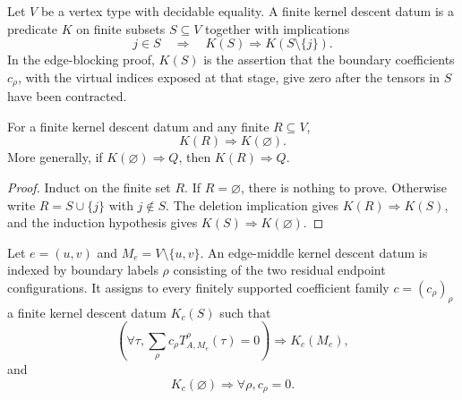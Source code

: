 \begin{definition}%
    \label{def:peps_finiteRegionKernelDescent}
    \leanok
    Let $V$ be a vertex type with decidable equality. A finite kernel descent
    datum is a predicate $K$ on finite subsets $S\subseteq V$ together with
    implications
    \[
        j\in S \quad\Longrightarrow\quad K(S)\Longrightarrow K(S\setminus\{j\}).
    \]
    In the edge-blocking proof, $K(S)$ is the assertion that the boundary
    coefficients $c_{\rho}$, with the virtual indices exposed at that stage,
    give zero after the tensors in $S$ have been contracted.
\end{definition}

\begin{lemma}%
    \label{lem:peps_finiteRegionKernelDescent}
    \leanok
    For a finite kernel descent datum and any finite $R\subseteq V$,
    \[
        K(R)\Longrightarrow K(\varnothing).
    \]
    More generally, if $K(\varnothing)\Longrightarrow Q$, then
    $K(R)\Longrightarrow Q$.
\end{lemma}
\begin{proof}\leanok
    Induct on the finite set $R$. If $R=\varnothing$, there is nothing to
    prove. Otherwise write $R=S\cup\{j\}$ with $j\notin S$. The deletion
    implication gives $K(R)\Longrightarrow K(S)$, and the induction hypothesis
    gives $K(S)\Longrightarrow K(\varnothing)$.
\end{proof}

\begin{definition}%
    \label{def:peps_edgeMiddleKernelDescentData}
    \leanok
    Let $e=(u,v)$ and $M_e=V\setminus\{u,v\}$. An edge-middle kernel descent
    datum is indexed by boundary labels $\rho$ consisting of the two residual
    endpoint configurations. It assigns to every finitely supported coefficient
    family $c=(c_{\rho})_{\rho}$ a finite kernel descent datum $K_c(S)$ such that
    \[
        \left(\forall\tau,
        \sum_{\rho}c_{\rho}
        T_{A,M_e}^{\rho}(\tau)=0\right)
        \Longrightarrow K_c(M_e),
    \]
    and
    \[
        K_c(\varnothing)\Longrightarrow \forall\rho, c_{\rho}=0.
    \]
\end{definition}

